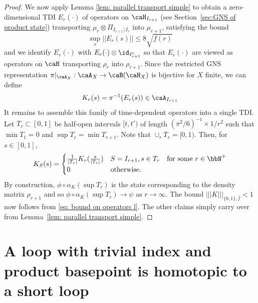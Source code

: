 \begin{proof}
	We now apply Lemma \ref{lem: parallel transport simple} to obtain a zero-dimensional TDI $E_r(\cdot)$ of operators on $\caH_{I_{r+1}}$ (see Section~\ref{sec:GNS of product state}) transporting $\mu_r\otimes \Pi_{I_{r+1}\setminus I_r}$ into  $\mu_{r+1}$, satisfying the bound 
	\begin{equation}\label{eq: bound on operators l}
		\sup_{s}||E_r(s)|| \leq 8 \sqrt{f(r)}
	\end{equation}
	and we identify $E_r(\cdot)$ with $E_r(\cdot)\otimes \id_{I_{r+1}^c}$ so that $E_r(\cdot)$ are viewed as operators on $\caH$ transporting $\rho_r$ into $\rho_{r+1}$. Since the restricted GNS representation $\pi|_{\caA_X}:\caA_X\to \caB(\caH_X)$ is bijective for $X$ finite, we can define
	$$
	K_r(s)=\pi^{-1}(E_r(s))  \in \caA_{I_{r+1}}
	$$
	It remains to assemble this family of time-dependent operators into a single TDI.
	Let $T_r \subset [0,1]$ be half-open intervals $[t,t')$ of length $(\pi^2/6)^{-1} \times 1/r^2$ such that $\min T_1=0$ and $\sup T_{r}=\min T_{r+1}$. Note that $\cup_{r} T_r=[0,1)$. Then, for $s\in [0,1]$,
	$$
	K_{S}(s)= \begin{cases}  \frac{1}{|T_r|}  K_r(\frac{s}{|T_r|})   &    S=I_{r+1}, s\in T_r \quad \text{for some $r\in \bbN^+$} \\
		0 & \text{otherwise}. \end{cases}
	$$
	By construction, $\phi\circ\alpha_K(\sup T_r)$ is the state corresponding to the density matrix $\rho_{r+1}$ and so $\phi\circ\alpha_K(\sup T_r)\to \psi$ as $r\to\infty$. The bound $ |||K|||_{\{0,1\},\hat{f}}<1$ now follows from \eqref{eq: bound on operators l}.  The other claims simply carry over from Lemma~\ref{lem: parallel transport simple}. 
\end{proof}






\section{A loop with trivial index and product basepoint is homotopic to a short loop}  \label{sec: trivial index loop is short}

